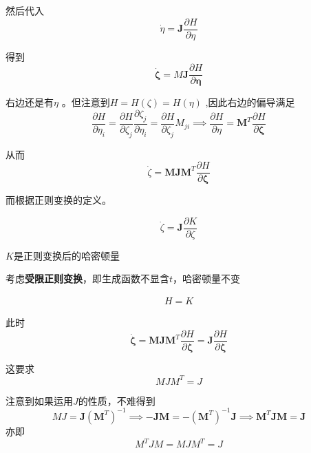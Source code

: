 \documentclass[12pt]{ctexart}
\begin{document}
然后代入
\begin{equation}
\dot{\eta}=\boldsymbol{J}\frac{\partial H}{\partial\eta}
\label{eq:13}
\end{equation}

得到
\begin{equation}
    \dot{\boldsymbol{\zeta}}=M\boldsymbol{J}\frac{\partial H}{\partial\boldsymbol{\eta}}
    \label{eq:14}
\end{equation}

右边还是有$\eta$ 。但注意到$H=H(\zeta)=H(\eta)$ ,因此右边的偏导满足
\begin{equation}\frac{\partial H}{\partial\eta_i}=\frac{\partial H}{\partial\zeta_j}\frac{\partial\zeta_j}{\partial\eta_i}=\frac{\partial H}{\partial\zeta_j}M_{ji}\implies\frac{\partial H}{\partial\eta}=\boldsymbol{M}^T\frac{\partial H}{\partial\boldsymbol{\zeta}}
    \label{eq:15}
\end{equation}

从而
\begin{equation}
\dot{\zeta}=\boldsymbol{MJM}^T\frac{\partial H}{\partial\boldsymbol{\zeta}}
\label{eq:16}
\end{equation}

而根据正则变换的定义。


\begin{equation}
    \dot{\zeta}=\boldsymbol{J}\frac{\partial K}{\partial\zeta}
    \label{eq:17}
\end{equation}

$K$是正则变换后的哈密顿量

考虑\textbf{受限正则变换}，即生成函数不显含$t$，哈密顿量不变

\begin{eqnarray}
    H=K
    \label{eq:18}
\end{eqnarray}

此时
\begin{equation}\dot{\boldsymbol{\zeta}}=\boldsymbol{MJM}^T\frac{\partial H}{\partial\boldsymbol{\zeta}}=\boldsymbol{J}\frac{\partial H}{\partial\boldsymbol{\zeta}}
    \label{eq:19}
\end{equation}

这要求
\begin{equation}
    MJM^T=J
    \label{eq:20}
\end{equation}

注意到如果运用$J$的性质，不难得到
\begin{equation}
    MJ=\boldsymbol{J}(\boldsymbol{M}^T)^{-1}\implies-\boldsymbol{J}\boldsymbol{M}=-(\boldsymbol{M}^T)^{-1}\boldsymbol{J}\implies\boldsymbol{M}^T\boldsymbol{J}\boldsymbol{M}=\boldsymbol{J}
    \label{eq:21}
\end{equation}
亦即
\begin{equation}
    \boxed{M^TJM=MJM^T=J}
    \label{eq:22}
\end{equation}
\end{document}
